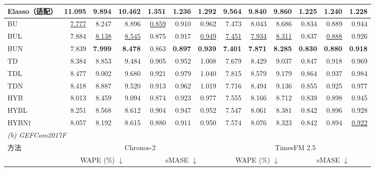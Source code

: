 \begin{table}[!htbp]
\begin{tabular*}{\textwidth}{@{\extracolsep{\fill}}l*{12}{r}@{}}
Elasso（适配） & 11.095 & 9.894 & 10.462 & 1.351 & 1.236 & 1.292 & 9.564 & 9.840 & 9.860 & 1.225 & 1.240 & 1.228 \\
\midrule
BU & \cellcolor{accuracysecond}\underline{7.777} & 8.247 & 8.896 & \cellcolor{accuracysecond}\underline{0.859} & 0.910 & 0.962 & 7.473 & 8.043 & 8.686 & 0.834 & 0.889 & 0.944 \\
BUL & 7.884 & \cellcolor{accuracysecond}\underline{8.138} & \cellcolor{accuracysecond}\underline{8.545} & 0.875 & 0.917 & \cellcolor{accuracysecond}\underline{0.949} & \cellcolor{accuracysecond}\underline{7.451} & \cellcolor{accuracysecond}\underline{7.934} & \cellcolor{accuracysecond}\underline{8.311} & 0.837 & \cellcolor{accuracysecond}\underline{0.888} & 0.926 \\
BUN & 7.839 & \cellcolor{accuracybest}\textbf{7.999} & \cellcolor{accuracybest}\textbf{8.478} & 0.863 & \cellcolor{accuracybest}\textbf{0.897} & \cellcolor{accuracybest}\textbf{0.939} & \cellcolor{accuracybest}\textbf{7.401} & \cellcolor{accuracybest}\textbf{7.871} & \cellcolor{accuracybest}\textbf{8.285} & \cellcolor{accuracybest}\textbf{0.830} & \cellcolor{accuracybest}\textbf{0.880} & \cellcolor{accuracybest}\textbf{0.918} \\
TD & 8.384 & 8.853 & 9.484 & 0.905 & 0.952 & 1.008 & 7.679 & 8.429 & 9.037 & 0.847 & 0.918 & 0.969 \\
TDL & 8.477 & 9.002 & 9.680 & 0.921 & 0.979 & 1.040 & 7.815 & 8.579 & 9.179 & 0.864 & 0.937 & 0.984 \\
TDN & 8.418 & 8.887 & 9.520 & 0.913 & 0.962 & 1.019 & 7.716 & 8.494 & 9.136 & 0.855 & 0.925 & 0.977 \\
HYB & 8.013 & 8.459 & 9.094 & 0.874 & 0.923 & 0.977 & 7.555 & 8.166 & 8.712 & 0.839 & 0.898 & 0.945 \\
HYBL & 8.251 & 8.568 & 8.612 & 0.904 & 0.947 & 0.952 & 7.547 & 8.061 & 8.381 & 0.842 & 0.896 & 0.928 \\
HYBN$\dagger$ & 8.057 & 8.192 & 8.615 & 0.880 & 0.911 & 0.950 & 7.574 & 8.076 & 8.323 & 0.842 & 0.894 & \cellcolor{accuracysecond}\underline{0.922} \\
\midrule
\multicolumn{13}{l}{\textit{(b) GEFCom2017F}} \\
方法 & \multicolumn{6}{c}{Chronos-2} & \multicolumn{6}{c}{TimesFM 2.5} \\
\cmidrule(lr){2-7}\cmidrule(l){8-13}
 & \multicolumn{3}{c}{WAPE (\%) $\downarrow$} & \multicolumn{3}{c}{sMASE $\downarrow$} & \multicolumn{3}{c}{WAPE (\%) $\downarrow$} & \multicolumn{3}{c}{sMASE $\downarrow$} \\

\end{tabular*}
\end{table}

